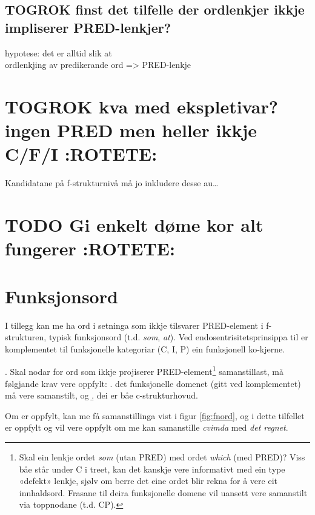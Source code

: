 \documentclass[11pt,a4paper,oneside,draft]{book}
\begin{document}
\subsection{\textbf{TOGROK} finst det tilfelle der ordlenkjer ikkje impliserer PRED-lenkjer?}
\label{sec-3.5.1}

   hypotese: det er alltid slik at \\
   ordlenkjing av predikerande ord => PRED-lenkje
\section{\textbf{TOGROK} kva med ekspletivar? ingen PRED men heller ikkje C/F/I \textbf{:ROTETE:}}
\label{sec-3.6}

Kandidatane på f-strukturnivå må jo inkludere desse au\ldots{}
\section{\textbf{TODO} Gi enkelt døme kor alt fungerer \textbf{:ROTETE:}}
\label{sec-3.7}


\section{Funksjonsord}
\label{sec-3.8}

\label{SEC:fnord}
I tillegg kan me ha ord i setninga som ikkje tilsvarer PRED-element i
f-strukturen, typisk funksjonsord (t.d. \emph{som}, \emph{at}). Ved
endosentrisitetsprinsippa til \citet{bresnan2001lfs} er komplementet
til funksjonelle kategoriar (C, I, P) ein funksjonell ko-kjerne. 

\ex. \label{fnordkrav} Skal nodar for ord som ikkje projiserer
     PRED-element\footnote{Skal ein lenkje ordet \emph{som} (utan PRED) med ordet \emph{which} (med
 PRED)? Viss båe står under C i treet, kan det kanskje vere
 informativt med ein type «defekt» lenkje, sjølv om berre det eine
 ordet blir rekna for å vere eit innhaldsord. Frasane til deira
 funksjonelle domene vil uansett vere samanstilt via toppnodane
 (t.d. CP). } samanstillast, må følgjande krav vere oppfylt:
\a. det funksjonelle domenet (gitt ved komplementet) må vere
   samanstilt, og
\b. dei er båe c-strukturhovud.


Om \Last[a og -b] er oppfylt, kan me få samanstillinga vist i figur
\ref{fig:fnord}, og i dette tilfellet er \Last[b] oppfylt og \Last[a]
vil vere oppfylt om me kan samanstille \emph{cvimda} med \emph{det regnet}.
\end{document}
